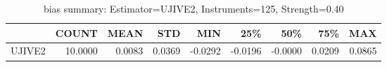 \begin{table}[ht]
\centering
\caption{bias summary: Estimator=UJIVE2, Instruments=125, Strength=0.40}
\begin{tabular}{lrrrrrrrr}
\toprule
 & COUNT & MEAN & STD & MIN & 25\% & 50\% & 75\% & MAX \\
\midrule
UJIVE2 & 10.0000 & 0.0083 & 0.0369 & -0.0292 & -0.0196 & -0.0000 & 0.0209 & 0.0865 \\
\bottomrule
\end{tabular}
\end{table}
